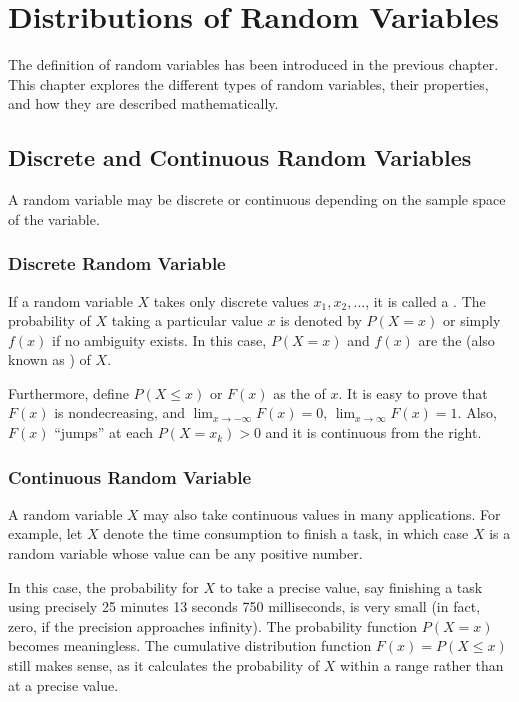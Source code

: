\chapter{Distributions of Random Variables} \label{ch:rv}

The definition of random variables has been introduced in the previous chapter. This chapter explores the different types of random variables, their properties, and how they are described mathematically.

\section{Discrete and Continuous Random Variables}

A random variable may be discrete or continuous depending on the sample space of the variable.

\subsection{Discrete Random Variable}

If a random variable $X$ takes only discrete values $x_1, x_2, \ldots$, it is called a .
The probability of $X$ taking a particular value $x$ is denoted by $P(X=x)$ or simply $f(x)$ if no ambiguity exists. In this case, $P(X=x)$ and $f(x)$ are the  (also known as ) of $X$.

Furthermore, define $P(X\leq x)$ or $F(x)$ as the  of $x$. It is easy to prove that $F(x)$ is nondecreasing, and $\lim_{x\rightarrow -\infty}F(x)=0$, $\lim_{x\rightarrow \infty}F(x)=1$. Also, $F(x)$ ``jumps'' at each $P(X=x_k)>0$ and it is continuous from the right.

\subsection{Continuous Random Variable}

A random variable $X$ may also take continuous values in many applications. For example, let $X$ denote the time consumption to finish a task, in which case $X$ is a random variable whose value can be any positive number.

In this case, the probability for $X$ to take a precise value, say finishing a task using precisely 25 minutes 13 seconds 750 milliseconds, is very small (in fact, zero, if the precision approaches infinity). The probability function $P(X=x)$ becomes meaningless. The cumulative distribution function $F(x) = P(X\leq x)$ still makes sense, as it calculates the probability of $X$ within a range rather than at a precise value.

